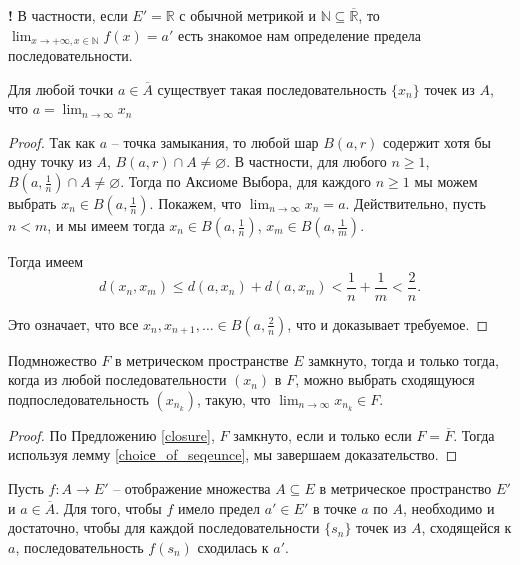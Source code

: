 \begin{mydanger}{\bf{!}}
    В частности, если $E' = \mathbb{R}$ с обычной метрикой и $\mathbb{N} \subseteq \overline{\mathbb{R}}$, то $\lim_{x \to +\infty, x \in \mathbb{{N}}}f(x) =a'$ есть знакомое нам определение предела последовательности.
\end{mydanger}

\begin{lemma}\label{choice_of_seqeunce}
    Для любой точки $a \in \overline{A}$ существует такая последовательность $\{x_n\}$ точек из $A$, что $a = \lim_{n \to \infty} x_n$
\end{lemma}

\begin{proof}
    Так как $a$ -- точка замыкания, то любой шар $B(a, r)$ содержит хотя бы одну точку из $A$, \ie $B(a, r) \cap A \ne \varnothing$. В частности, для любого $n\ge 1$, $B(a, \frac{1}{n}) \cap A \ne \varnothing$. Тогда по Аксиоме Выбора, для каждого $n\ge 1$ мы можем выбрать $x_n \in B(a, \frac{1}{n})$. Покажем, что $\lim_{n \to \infty} x_n = a$. Действительно, пусть $n<m$, и мы имеем тогда $x_n \in B(a, \frac{1}{n})$, $x_m \in B(a, \frac{1}{m})$. 

    Тогда имеем
    \[
     d(x_n, x_m) \le d(a,x_n) + d(a,x_m) <\frac{1}{n} + \frac{1}{m} < \frac{2}{n}.
    \]

Это означает, что все $x_n, x_{n+1}, \ldots \in B(a, \frac{2}{n})$, что и доказывает требуемое.
\end{proof}

\begin{corollary}\label{Weirstrass_mega}
    Подмножество $F$ в метрическом пространстве $E$ замкнуто, тогда и только тогда, когда из любой последовательности $(x_n)$ в $F$, можно выбрать сходящуюся подпоследовательность $(x_{n_k})$, такую, что $\lim_{n\to \infty} x_{n_k} \in F$. 
\end{corollary}

\begin{proof}
    По Предложению \ref{closure}, $F$ замкнуто, если и только если $F = \overline{F}$. Тогда используя лемму \ref{choicе_of_seqeunce}, мы завершаем доказательство. 
\end{proof}



\begin{theorem}\label{lim=>for_any_sequence}
    Пусть $f: A \to E'$ -- отображение множества $A \subseteq E$ в метрическое пространство $E'$ и $a \in \overline{A}.$ Для того, чтобы $f$ имело предел $a' \in E'$ в точке $a$ по $A$, необходимо и достаточно, чтобы для каждой последовательности $\{s_n\}$ точек из $A$, сходящейся к $a$, последовательность $f(s  _n)$ сходилась к $a'.$
\end{theorem}

